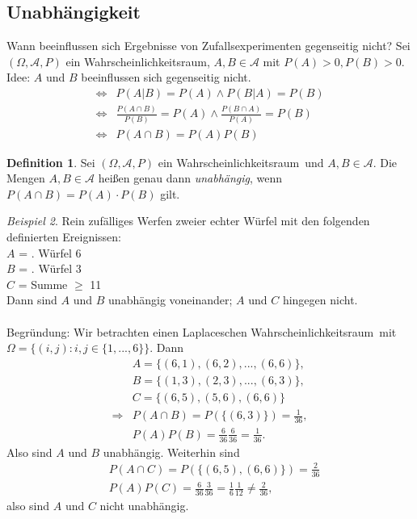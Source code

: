 \documentclass[a4paper,12pt,fleqn]{scrartcl}
\newcommand{\m}[1]{\mathcal{ #1 }}
\newcommand{\ZE}{Zufallsexperiment}
\newcommand{\WR}{Wahrscheinlichkeitsraum}
\theoremstyle{definition}
\newtheorem{definition}{Definition}[section]
\theoremstyle{plain}
\theoremstyle{remark}
\newtheorem{beispiel}[definition]{Beispiel}
\begin{document}
\subsection{Unabhängigkeit}
Wann beeinflussen sich Ergebnisse von \ZE en gegenseitig nicht? Sei $( \Omega , \m{A} , P)$ ein \WR, $A,B \in \m{A} $ mit $ P(A) > 0, P(B) > 0$. \\
Idee: $A$ und $B$ beeinflussen sich gegenseitig nicht.
\begin{align*}
\Leftrightarrow & P(A|B) = P(A) \land P(B|A) = P(B) \\
\Leftrightarrow & \frac{P(A \cap B)}{P(B)} = P(A) \land \frac{P(B \cap A)}{P(A)} = P(B) \\
\Leftrightarrow & P(A \cap B) = P(A)P(B)
\end{align*}
\begin{definition}
Sei $( \Omega , \m{A} , P)$ ein \WR \, und $A,B \in \m{A}$. Die Mengen $ A,B \in \m{A} $ heißen genau dann \emph{unabhängig}, wenn $ P(A \cap B) = P(A) \cdot P(B) $ gilt.
\end{definition}
\begin{beispiel}
Rein zufälliges Werfen zweier echter Würfel mit den folgenden definierten Ereignissen:\\
$A$ = . Würfel 6\grqq \\
$B$ = . Würfel 3\grqq \\
$C$ = \glqq Summe $\geq$ 11 \grqq\\
Dann sind $A$ und $B$ unabhängig voneinander; $A$ und $C$ hingegen nicht.
\\ \\
Begründung: Wir betrachten einen Laplaceschen \WR \, mit $ \Omega = \{ (i,j) : i,j \in \{ 1,...,6 \} \}$. Dann 
\begin{align*}
& A = \{ (6,1),(6,2),...,(6,6) \}, \\
& B = \{ (1,3),(2,3),...,(6,3) \}, \\
& C = \{ (6,5),(5,6),(6,6) \} \\
\Rightarrow & P(A \cap B) = P( \{ (6,3) \} ) = \frac{1}{36}, \\
& P(A)P(B) = \frac{6}{36} \frac{6}{36} = \frac{1}{36}.
\end{align*}
Also sind $A$ und $B$ unabhängig. Weiterhin sind
\begin{align*}
& P(A \cap C ) = P(\{ (6,5),(6,6) \} ) = \frac{2}{36} \\
& P(A)P(C) = \frac{6}{36} \frac{3}{36} = \frac{1}{6} \frac{1}{12} \neq \frac{2}{36},
\end{align*}
also sind $A$ und $C$ nicht unabhängig.
\end{beispiel}
\end{document}
